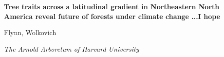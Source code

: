 \documentclass{article}
\begin{document}
\linenumbers
 

\flushleft

\textbf{\large{Tree traits across a latitudinal gradient in Northeastern North America reveal future of forests under climate change} \small{ ...I hope}}

Flynn, Wolkovich

\textit{The Arnold Arboretum of Harvard University}
\end{document}
